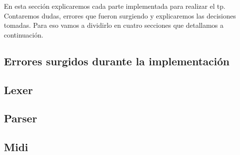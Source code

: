 En esta sección explicaremos cada parte implementada para realizar el tp. Contaremos dudas, errores que fueron surgiendo y explicaremos las decisiones tomadas. Para eso vamos a dividirlo en cuatro secciones que detallamos a continuación.
\subsection{Errores surgidos durante la implementación}
\subsection{Lexer}
\subsection{Parser}
\subsection{Midi}